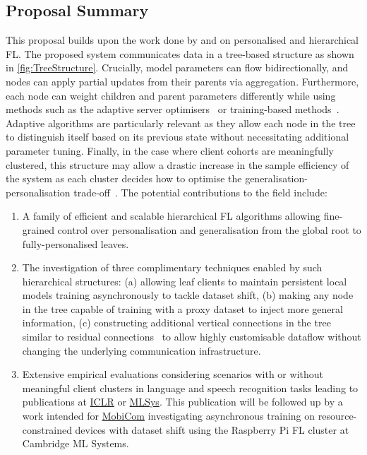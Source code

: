\subsection{Proposal Summary}

This proposal builds upon the work done by \citet{EuroMLSysWorkshop} and \citet{OperaWorkshop} on personalised and hierarchical FL. The proposed system communicates data in a tree-based structure as shown in \cref{fig:TreeStructure}. Crucially, model parameters can flow bidirectionally, and nodes can apply partial updates from their parents via aggregation. Furthermore, each node can weight children and parent parameters differently while using methods such as the adaptive server optimisers~\citep{FedOPT} or training-based methods~\citep{Ditto,EWC,DeepMutualLearning,PersonalisedFLFirstOrder}. Adaptive algorithms are particularly relevant as they allow each node in the tree to distinguish itself based on its previous state without necessitating additional parameter tuning. Finally, in the case where client cohorts are meaningfully clustered, this structure may allow a drastic increase in the sample efficiency of the system as each cluster decides how to optimise the generalisation-personalisation trade-off~\citep{PersonalisationGeneralisationTradeoff}. The potential contributions to the field include:
\begin{enumerate}
    \item A family of efficient and scalable hierarchical FL algorithms allowing fine-grained control over personalisation and generalisation from the global root to fully-personalised leaves.
    \item The investigation of three complimentary techniques enabled by such hierarchical structures: (a) allowing leaf clients to maintain persistent local models training asynchronously to tackle dataset shift, (b) making any node in the tree capable of training with a proxy dataset to inject more general information, (c) constructing additional vertical connections in the tree similar to residual connections~\citep{ResNet} to allow highly customisable dataflow without changing the underlying communication infrastructure.
    \item Extensive empirical evaluations considering scenarios with or without meaningful client clusters in language and speech recognition tasks leading to publications at \href{https://iclr.cc/}{ICLR} or \href{https://mlsys.org/}{MLSys}. This publication will be followed up by a work intended for \href{https://sigmobile.org/mobicom/2023/}{MobiCom} investigating asynchronous training on resource-constrained devices with dataset shift using the Raspberry Pi FL cluster at Cambridge ML Systems.
\end{enumerate}









